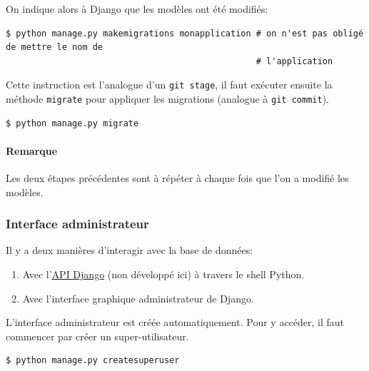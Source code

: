 \documentclass[a4paper, 10pt]{article}
\begin{document}
On indique alors à Django que les modèles ont été modifiés:
\begin{verbatim}
$ python manage.py makemigrations monapplication # on n'est pas obligé de mettre le nom de
                                                 # l'application
\end{verbatim}

Cette instruction est l'analogue d'un \texttt{git stage}, il faut exécuter ensuite la méthode \texttt{migrate} pour appliquer les migrations (analogue à \texttt{git commit}).

\begin{verbatim}
$ python manage.py migrate
\end{verbatim}

\paragraph{Remarque} Les deux étapes précédentes sont à répéter à chaque fois que l'on a modifié les modèles.

\subsubsection{Interface administrateur}
Il y a deux manières d'interagir avec la base de données:
\begin{enumerate}
	\item Avec l'\href{https://docs.djangoproject.com/fr/2.0/topics/db/queries/}{API Django} (non développé ici) à travers le shell Python.
	\item Avec l'interface graphique administrateur de Django.
\end{enumerate}

L'interface administrateur est créée automatiquement. Pour y accéder, il faut commencer par créer un super-utilisateur.

\begin{verbatim}
$ python manage.py createsuperuser
\end{verbatim}
\end{document}
